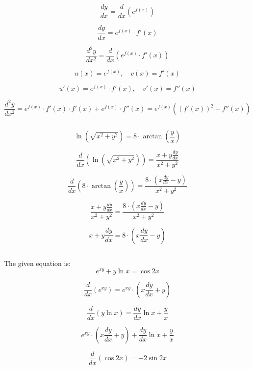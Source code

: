 \documentclass{article}
\begin{document}
\subsection{}

\[
\frac{dy}{dx} = \frac{d}{dx} \left( e^{f(x)} \right)
\]

\[
\frac{dy}{dx} = e^{f(x)} \cdot f'(x)
\]


\[
\frac{d^2y}{dx^2} = \frac{d}{dx} \left( e^{f(x)} \cdot f'(x) \right)
\]

\[
u(x) = e^{f(x)}, \quad v(x) = f'(x)
\]

\[
u'(x) = e^{f(x)} \cdot f'(x), \quad v'(x) = f''(x)
\]

\[
\frac{d^2y}{dx^2} = e^{f(x)} \cdot f'(x) \cdot f'(x) + e^{f(x)} \cdot f''(x)
=
\boxed{e^{f(x)} \left( \left( f'(x) \right)^2 + f''(x) \right)}
\]


\subsection{}

\[
\ln(\sqrt{x^2 + y^2}) = 8 \cdot \arctan\left(\frac{y}{x}\right)
\]


\[
\frac{d}{dx} \left( \ln(\sqrt{x^2 + y^2}) \right) = \frac{x + y \frac{dy}{dx}}{x^2 + y^2}
\]


\[
\frac{d}{dx} \left( 8 \cdot \arctan\left( \frac{y}{x} \right) \right) = \frac{8 \cdot (x \frac{dy}{dx} - y)}{x^2 + y^2}
\]


\[
\frac{x + y \frac{dy}{dx}}{x^2 + y^2} = \frac{8 \cdot (x \frac{dy}{dx} - y)}{x^2 + y^2}
\]


\[
x + y \frac{dy}{dx} = 8 \cdot (x \frac{dy}{dx} - y)
\]




\subsection{}

The given equation is:
\[
e^{xy} + y \ln x = \cos 2x
\]


\[
\frac{d}{dx} \left( e^{xy} \right) = e^{xy} \cdot (x \frac{dy}{dx} + y)
\]


\[
\frac{d}{dx} \left( y \ln x \right) = \frac{dy}{dx} \ln x + \frac{y}{x}
\]

\[
e^{xy} \cdot (x \frac{dy}{dx} + y) + \frac{dy}{dx} \ln x + \frac{y}{x}
\]


\[
\frac{d}{dx} \left( \cos 2x \right) = -2 \sin 2x
\]
\end{document}

